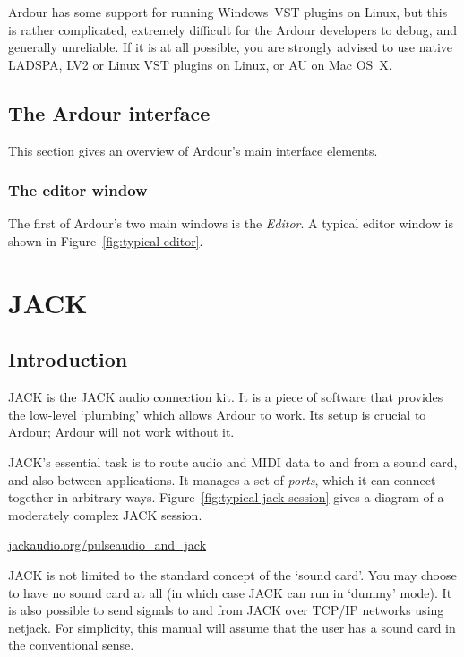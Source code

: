 \documentclass[10pt,a4paper]{book}
\begin{document}
Ardour has some support for running Windows~VST plugins on Linux, but
this is rather complicated, extremely difficult for the Ardour
developers to debug, and generally unreliable.  If it is at all
possible, you are strongly advised to use native LADSPA, LV2 or Linux
VST plugins on Linux, or AU on Mac OS~X\@.


\section{The Ardour interface}

This section gives an overview of Ardour's main interface elements.

\subsection{The editor window}

The first of Ardour's two main windows is the \emph{Editor}.  A
typical editor window is shown in Figure~\ref{fig:typical-editor}.




\chapter{JACK}
\label{ch:jack}

\section{Introduction}

JACK is the JACK audio connection kit.  It is a piece of software that
provides the low-level `plumbing' which allows Ardour to work.  Its
setup is crucial to Ardour; Ardour will not work without it.

JACK's essential task is to route audio and MIDI data to and from a
sound card, and also between applications.  It manages a set of
\emph{ports}, which it can connect together in arbitrary ways.
Figure~\ref{fig:typical-jack-session} gives a diagram of a moderately
complex JACK session.

\url{jackaudio.org/pulseaudio_and_jack}

\begin{danger}
JACK is not limited to the standard concept of the `sound card'.  You
may choose to have no sound card at all (in which case JACK can run in
`dummy' mode).  It is also possible to send signals to and from JACK
over TCP/IP networks using netjack.  For simplicity, this manual will
assume that the user has a sound card in the conventional sense.
\end{danger}
\end{document}
